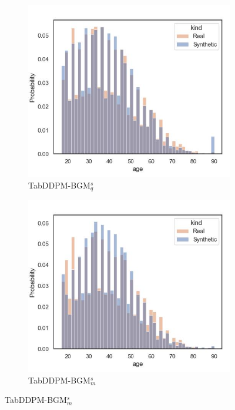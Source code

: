 \begin{figure}[H]
	\begin{subfigure}{0.3\textwidth}
		\centering
		\includegraphics[width=\textwidth]{images/dist_age/tab-ddpm-bgm-simTune.jpg}
		\caption{TabDDPM-BGM$^{s}_q$}
	\end{subfigure}
	\begin{subfigure}{0.3\textwidth}
		\centering
		\includegraphics[width=\textwidth]{images/dist_age/tab-ddpm-bgm-simTune-minmax.jpg}
		\caption{TabDDPM-BGM$^{s}_m$}
	\end{subfigure}

\end{figure}

